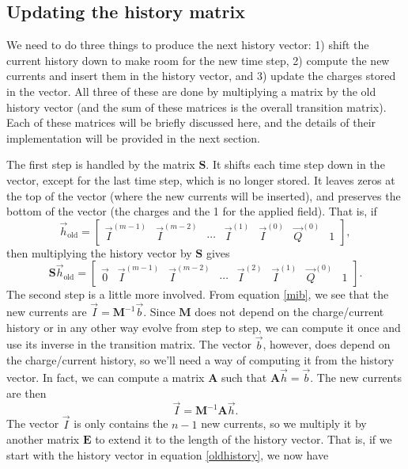 \documentclass{article}
\newcommand{\mat}{\mathbf}
\begin{document}
\subsection{Updating the history matrix}
We need to do three things to produce the next history vector: 1) shift the current history down to make room for the new time step, 2) compute the new currents and insert them in the history vector, and 3) update the charges stored in the vector. All three of these are done by multiplying a matrix by the old history vector (and the sum of these matrices is the overall transition matrix). Each of these matrices will be briefly discussed here, and the details of their implementation will be provided in the next section.

The first step is handled by the matrix $\mat{S}$. It shifts each time step down in the vector, except for the last time step, which is no longer stored. It leaves zeros at the top of the vector (where the new currents will be inserted), and preserves the bottom of the vector (the charges and the 1 for the applied field). That is, if
\begin{equation}
\label{oldhistory}
\vec{h}_\text{old} = 
\begin{bmatrix}
\vec{I}^{(m-1)} & \vec{I}^{(m-2)} & \cdots & \vec{I}^{(1)} & \vec{I}^{(0)} & \vec{Q}^{(0)} & 1
\end{bmatrix},
\end{equation}
then multiplying the history vector by $\mat{S}$ gives
\begin{equation}
\mat{S}\vec{h}_\text{old} = 
\begin{bmatrix}
\vec{0} & \vec{I}^{(m-1)} & \vec{I}^{(m-2)} & \cdots & \vec{I}^{(2)} & \vec{I}^{(1)} & \vec{Q}^{(0)} & 1
\end{bmatrix}.
\end{equation}
The second step is a little more involved. From equation \ref{mib}, we see that the new currents are $\vec{I} = \mat{M}^{-1}\vec{b}$. Since $\mat{M}$ does not depend on the charge/current history or in any other way evolve from step to step, we can compute it once and use its inverse in the transition matrix. The vector $\vec{b}$, however, does depend on the charge/current history, so we'll need a way of computing it from the history vector. In fact, we can compute a matrix $\mat{A}$ such that $\mat{A}\vec{h} = \vec{b}$. The new currents are then
\begin{equation}
\vec{I} = \mat{M}^{-1}\mat{A}\vec{h}.
\end{equation}
The vector $\vec{I}$ is only contains the $n-1$ new currents, so we multiply it by another matrix $\mat{E}$ to extend it to the length of the history vector. That is, if we start with the history vector in equation \ref{oldhistory}, we now have
\end{document}
